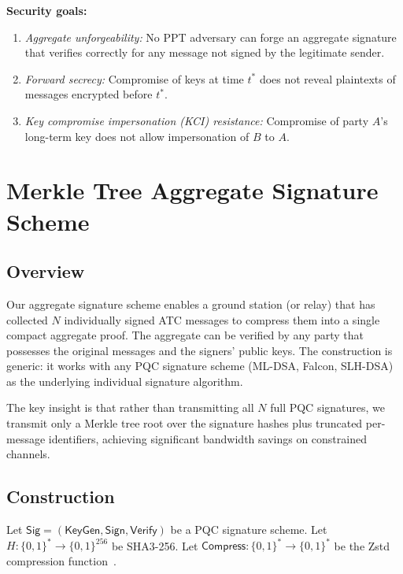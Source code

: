 \documentclass[conference,10pt]{IEEEtran}
\begin{document}
\textbf{Security goals:}
\begin{enumerate}
    \item \emph{Aggregate unforgeability:} No PPT adversary can forge an aggregate signature that verifies correctly for any message not signed by the legitimate sender.
    \item \emph{Forward secrecy:} Compromise of keys at time $t^*$ does not reveal plaintexts of messages encrypted before $t^*$.
    \item \emph{Key compromise impersonation (KCI) resistance:} Compromise of party $A$'s long-term key does not allow impersonation of $B$ to $A$.
\end{enumerate}

\section{Merkle Tree Aggregate Signature Scheme}
\label{sec:aggregate}

\subsection{Overview}

Our aggregate signature scheme enables a ground station (or relay) that has collected $N$ individually signed ATC messages to compress them into a single compact aggregate proof. The aggregate can be verified by any party that possesses the original messages and the signers' public keys. The construction is generic: it works with any PQC signature scheme (ML-DSA, Falcon, SLH-DSA) as the underlying individual signature algorithm.

The key insight is that rather than transmitting all $N$ full PQC signatures, we transmit only a Merkle tree root over the signature hashes plus truncated per-message identifiers, achieving significant bandwidth savings on constrained channels.

\subsection{Construction}

Let $\mathsf{Sig} = (\mathsf{KeyGen}, \mathsf{Sign}, \mathsf{Verify})$ be a PQC signature scheme. Let $H: \{0,1\}^* \to \{0,1\}^{256}$ be SHA3-256. Let $\mathsf{Compress}: \{0,1\}^* \to \{0,1\}^*$ be the Zstd compression function~\cite{zstd2021}.
\end{document}
